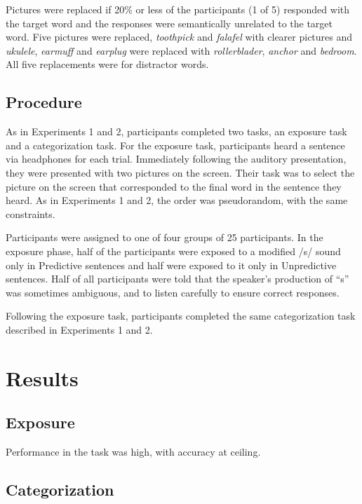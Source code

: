 Pictures were replaced if 20\% or less of the participants (1 of 5) responded with the target word and the responses were semantically unrelated to the target word. 
Five pictures were replaced, \emph{toothpick} and \emph{falafel} with clearer pictures and \emph{ukulele}, \emph{earmuff} and \emph{earplug} were replaced with \emph{rollerblader}, \emph{anchor} and \emph{bedroom}.  
All five replacements were for distractor words.

\subsection{Procedure}

As in Experiments 1 and 2, participants completed two tasks, an exposure task and a categorization task.  For the exposure task, participants heard a sentence via headphones for each trial.  Immediately following the auditory presentation, they were presented with two pictures on the screen.  Their task was to select the picture on the screen that corresponded to the final word in the sentence they heard.  As in Experiments 1 and 2, the order was pseudorandom, with the same constraints.

Participants were assigned to one of four groups of 25 participants.  
In the exposure phase, half of the participants were exposed to a modified /s/ sound only in Predictive sentences and half were exposed to it only in Unpredictive sentences.  
Half of all participants were told that the speaker's production of ``s'' was sometimes ambiguous, and to listen carefully to ensure correct responses.  

Following the exposure task, participants completed the same categorization task described in Experiments 1 and 2.

\section{Results}

\subsection{Exposure}

Performance in the task was high, with accuracy at ceiling.

\subsection{Categorization}


